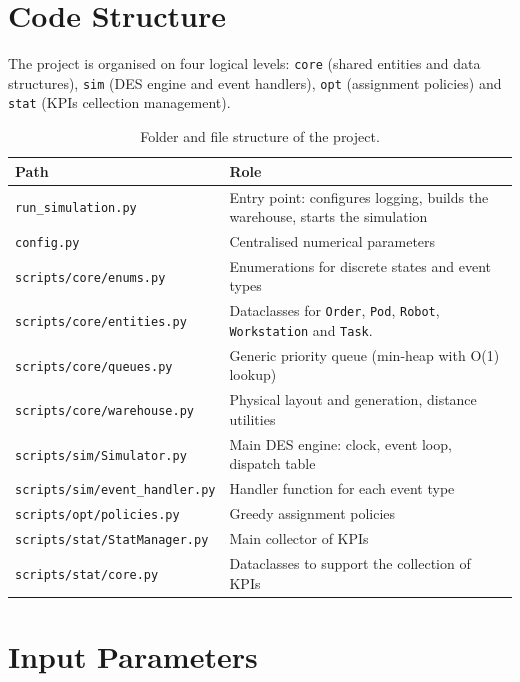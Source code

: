 \documentclass[a4paper,10pt]{article}
\begin{document}
\section{Code Structure}

The project is organised on four logical levels: \texttt{core} (shared entities and data structures), \texttt{sim} (DES engine and event handlers), \texttt{opt} (assignment policies) and \texttt{stat} (KPIs cellection management).

\begin{table}[htbp]
\begin{tabularx}{\textwidth}{l X}
\toprule
\textbf{Path} & \textbf{Role} \\
\midrule
\texttt{run\_simulation.py}          & Entry point: configures logging, builds the warehouse, starts the simulation \\
\texttt{config.py}                   & Centralised numerical parameters \\
\texttt{scripts/core/enums.py}       & Enumerations for discrete states and event types \\
\texttt{scripts/core/entities.py}    & Dataclasses for \texttt{Order}, \texttt{Pod}, \texttt{Robot}, \texttt{Workstation} and \texttt{Task}. \\
\texttt{scripts/core/queues.py}      & Generic priority queue (min-heap with O(1) lookup) \\
\texttt{scripts/core/warehouse.py}   & Physical layout and generation, distance utilities \\
\texttt{scripts/sim/Simulator.py}    & Main DES engine: clock, event loop, dispatch table \\
\texttt{scripts/sim/event\_handler.py} & Handler function for each event type \\
\texttt{scripts/opt/policies.py}     & Greedy assignment policies \\
\texttt{scripts/stat/StatManager.py} & Main collector of KPIs \\
\texttt{scripts/stat/core.py}        & Dataclasses to support the collection of KPIs \\
\bottomrule
\end{tabularx}
\caption{Folder and file structure of the project.}
\end{table}


\newpage
\section{Input Parameters}
\end{document}
